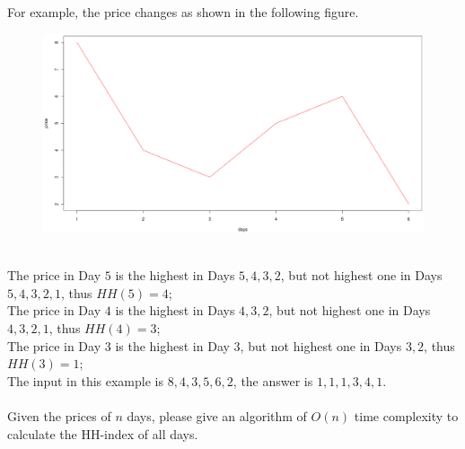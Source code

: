 For example, the price changes as shown in the following figure. 
%
\begin{figure}[htbp]
\centering
\includegraphics[width = 6in]{price.eps}
\label{fig:prices}
\end{figure}
%
\\
The price in Day $5$ is the highest in Days $5, 4, 3, 2$,  
but not highest one in Days $5, 4, 3, 2, 1$, thus $HH(5) = 4$;
\\
The price in Day $4$ is the highest in Days $4, 3, 2$,  
but not highest one in Days $4, 3, 2, 1$, thus $HH(4) = 3$;
\\
The price in Day $3$ is the highest in Day $3$,  
but not highest one in Days $3, 2$, thus $HH(3) = 1$;
\\
The input in this example is $8, 4, 3, 5, 6, 2$, 
the answer is $1, 1, 1, 3, 4, 1$.
\\ \\
Given the prices of $n$ days, 
please give an algorithm of $O(n)$ time complexity to calculate the HH-index of all days.


